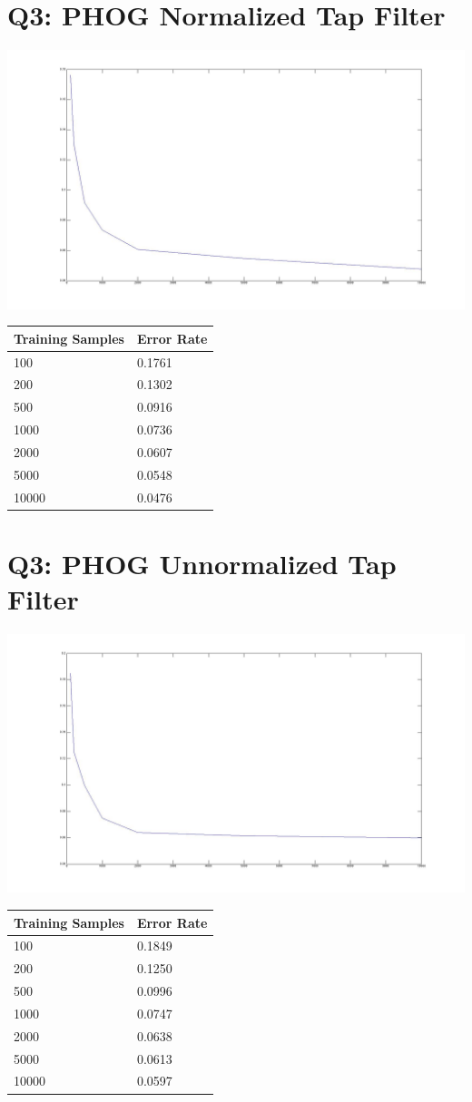 \documentclass[12pt]{article}
\begin{document}
\newpage
\section*{Q3: PHOG Normalized Tap Filter}
  \includegraphics[scale=0.3]{q3_normalized_tap.jpg}
  \begin{tabular}{l|l}
    \hline
    Training Samples & Error Rate \\
    \hline
    100   & 0.1761 \\
    200   & 0.1302 \\
    500   & 0.0916 \\
    1000  & 0.0736 \\
    2000  & 0.0607 \\
    5000  & 0.0548 \\
    10000 & 0.0476 \\
  \end{tabular}


\newpage
\section*{Q3: PHOG Unnormalized Tap Filter}
  \includegraphics[scale=0.3]{q3_unnormalized.jpg}
  \begin{tabular}{l|l}
    \hline
    Training Samples & Error Rate \\
    \hline
    100   & 0.1849 \\
    200   & 0.1250 \\
    500   & 0.0996 \\
    1000  & 0.0747 \\
    2000  & 0.0638 \\
    5000  & 0.0613 \\
    10000 & 0.0597 \\
  \end{tabular}
\end{document}
